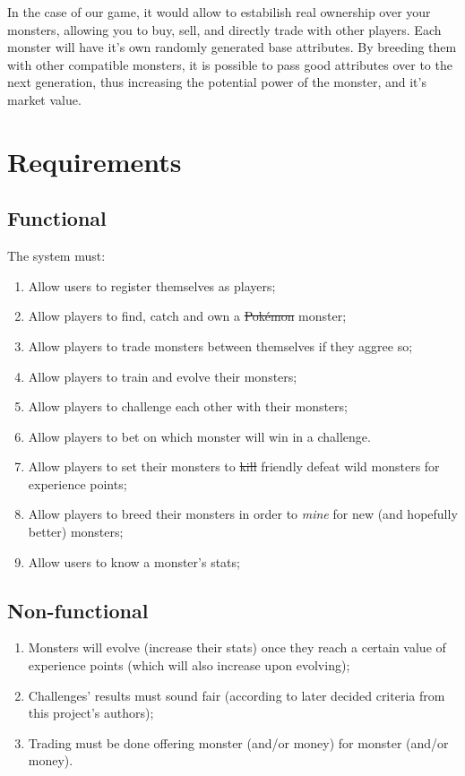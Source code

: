 \documentclass{article}
\begin{document}
    In the case of our game, it would allow to estabilish real ownership over your
    monsters, allowing you to buy, sell, and directly trade with other players. 
    Each monster will have it's own randomly generated base attributes. By breeding
    them with other compatible monsters, it is possible to pass good attributes over 
    to the next generation, thus increasing the potential power of the monster, and it's
    market value. 

    \section{Requirements}

    \subsection{Functional}

    The system must:

    \begin{enumerate}
        \item Allow users to register themselves as players;
        \item Allow players to find, catch and own a \st{Pokémon} monster;
        \item Allow players to trade monsters between themselves if they aggree
              so;
        \item Allow players to train and evolve their monsters;
        \item Allow players to challenge each other with their monsters;
        \item Allow players to bet on which monster will win in a challenge.
        \item Allow players to set their monsters to \st{kill} friendly defeat
              wild monsters for experience points;
        \item Allow players to breed their monsters in order to \textit{mine}
              for new (and hopefully better) monsters;
        \item Allow users to know a monster's stats;
    \end{enumerate}

    \subsection{Non-functional}

    \begin{enumerate}
        \item Monsters will evolve (increase their stats) once they reach a
              certain value of experience points (which will also increase upon
              evolving);
        \item Challenges' results must sound fair (according to later decided
              criteria from this project's authors);
        \item Trading must be done offering monster (and/or money) for monster
              (and/or money).
    \end{enumerate}
\end{document}
